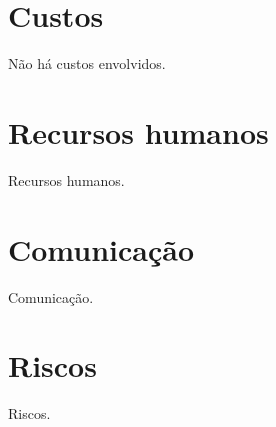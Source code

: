 \documentclass[
  12pt,
  openright,
  twoside,
  a4paper,
  english,
  brazil
]{abntex2}
\begin{document}
\chapter{Custos}\label{cap:custos}

Não há custos envolvidos.

\chapter{Recursos humanos}\label{cap:recursos_humanos}

Recursos humanos.

\chapter{Comunicação}\label{cap:comunicacao}

Comunicação.

\chapter{Riscos}\label{cap:riscos}

Riscos.

\postextual{}


\end{document}
